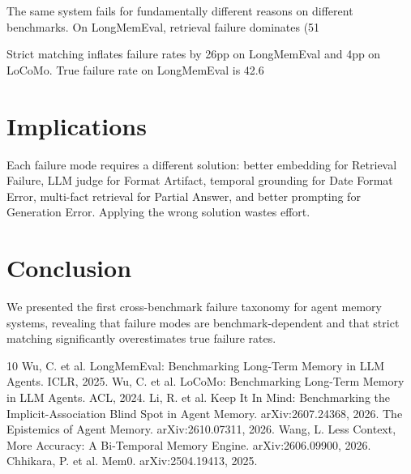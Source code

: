 ﻿\documentclass{article}
\begin{document}
The same system fails for fundamentally different reasons on different benchmarks. On LongMemEval, retrieval failure dominates (51%

Strict matching inflates failure rates by 26pp on LongMemEval and 4pp on LoCoMo. True failure rate on LongMemEval is 42.6%

\section{Implications}

Each failure mode requires a different solution: better embedding for Retrieval Failure, LLM judge for Format Artifact, temporal grounding for Date Format Error, multi-fact retrieval for Partial Answer, and better prompting for Generation Error. Applying the wrong solution wastes effort.

\section{Conclusion}

We presented the first cross-benchmark failure taxonomy for agent memory systems, revealing that failure modes are benchmark-dependent and that strict matching significantly overestimates true failure rates.


\begin{thebibliography}{10}
 Wu, C. et al. LongMemEval: Benchmarking Long-Term Memory in LLM Agents. ICLR, 2025.
 Wu, C. et al. LoCoMo: Benchmarking Long-Term Memory in LLM Agents. ACL, 2024.
 Li, R. et al. Keep It In Mind: Benchmarking the Implicit-Association Blind Spot in Agent Memory. arXiv:2607.24368, 2026.
 The Epistemics of Agent Memory. arXiv:2610.07311, 2026.
 Wang, L. Less Context, More Accuracy: A Bi-Temporal Memory Engine. arXiv:2606.09900, 2026.
 Chhikara, P. et al. Mem0. arXiv:2504.19413, 2025.
\end{thebibliography}
\end{document}
